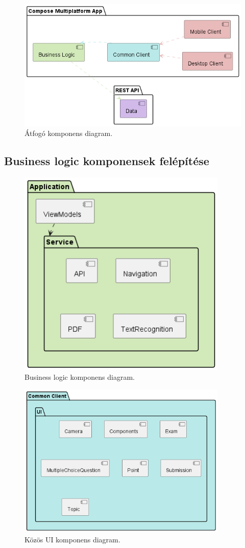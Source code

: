 \begin{figure}[!ht]
    \centering
    \includegraphics[width=150mm, keepaspectratio]{figures/Component.png}
    \caption{Átfogó komponens diagram.}
    \label{fig:ComponentDiagram}
\end{figure}

\subsection{Business logic komponensek felépítése}


\begin{figure}[!ht]
    \centering
    \includegraphics[width=100mm, keepaspectratio]{figures/Business Component.png}
    \caption{Business logic komponens diagram.}
    \label{fig:BusinessComponentDiagram}
\end{figure}

\begin{figure}[!ht]
    \centering
    \includegraphics[width=100mm, keepaspectratio]{figures/Common Component.png}
    \caption{Közös UI komponens diagram.}
    \label{fig:CommonComponentDiagram}
\end{figure}